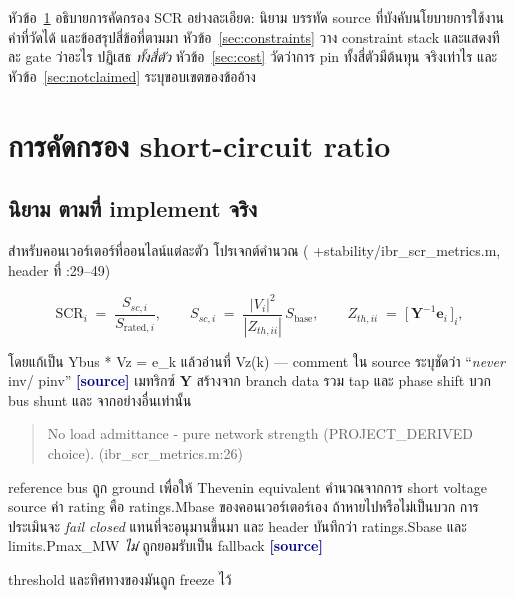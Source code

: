 \documentclass[12pt,a4paper]{article}
\theoremstyle{remark}
\newcommand{\code}[1]{{\ttfamily\small\hyphenchar\font=-1 #1}}
\newcommand{\sourcecode}{\textcolor{navy}{\textbf{[source]}}}
\begin{document}
หัวข้อ~\ref{sec:scr} อธิบายการคัดกรอง SCR อย่างละเอียด: นิยาม บรรทัด source
ที่บังคับนโยบายการใช้งาน ค่าที่วัดได้ และข้อสรุปสี่ข้อที่ตามมา
หัวข้อ~\ref{sec:constraints} วาง constraint stack และแสดงทีละ gate ว่าอะไร
ปฏิเสธ \emph{ทั้งสี่ตัว} หัวข้อ~\ref{sec:cost} วัดว่าการ pin ทั้งสี่ตัวมีต้นทุน
จริงเท่าไร และหัวข้อ~\ref{sec:notclaimed} ระบุขอบเขตของข้ออ้าง

\section{การคัดกรอง short-circuit ratio}\label{sec:scr}

\subsection{นิยาม ตามที่ implement จริง}

สำหรับคอนเวอร์เตอร์ที่ออนไลน์แต่ละตัว โปรเจกต์คำนวณ
(\code{+stability/ibr\_scr\_metrics.m}, header ที่ \code{:29--49})

\begin{equation}
\mathrm{SCR}_i \;=\; \frac{S_{sc,i}}{S_{\mathrm{rated},i}},
\qquad
S_{sc,i} \;=\; \frac{|V_i|^2}{|Z_{th,ii}|}\,S_{\text{base}},
\qquad
Z_{th,ii} \;=\; \bigl[\,\mathbf{Y}^{-1}\mathbf{e}_i\,\bigr]_i ,
\label{eq:scr}
\end{equation}

โดยแก้เป็น \code{Ybus * Vz = e\_k} แล้วอ่านที่ \code{Vz(k)} --- comment ใน source
ระบุชัดว่า ``\emph{never} \code{inv}/\code{pinv}'' \sourcecode{} เมทริกซ์
$\mathbf{Y}$ สร้างจาก branch data รวม tap และ phase shift บวก bus shunt และ
จากอย่างอื่นเท่านั้น

\begin{quote}\small
\code{No load admittance - pure network strength (PROJECT\_DERIVED choice).}
\code{\hfill(ibr\_scr\_metrics.m:26)}
\end{quote}

reference bus ถูก ground เพื่อให้ Thevenin equivalent คำนวณจากการ short
voltage source ค่า rating คือ \code{ratings.Mbase} ของคอนเวอร์เตอร์เอง
ถ้าหายไปหรือไม่เป็นบวก การประเมินจะ \emph{fail closed} แทนที่จะอนุมานขึ้นมา
และ header บันทึกว่า \code{ratings.Sbase} และ \code{limits.Pmax\_MW}
\emph{ไม่} ถูกยอมรับเป็น fallback \sourcecode

threshold และทิศทางของมันถูก freeze ไว้
\end{document}
